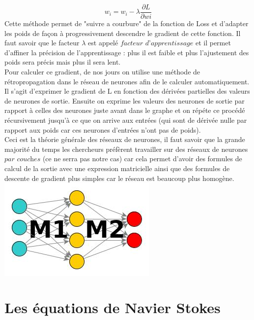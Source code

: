 \documentclass[12pt]{article}
\begin{document}
\[w_i = w_i-\lambda\frac{\partial L}{\partial wi}\]
Cette méthode permet de "suivre a courbure" de la fonction de Loss et d'adapter les poids de façon à progressivement descendre le gradient de cette fonction. Il faut savoir que le facteur $\lambda$ est appelé $\textit{facteur d'apprentissage}$ et il permet d'affiner la précision de l'apprentissage : plus il est faible et plus l'ajustement des poids sera précis mais plus il sera lent.\\
Pour calculer ce gradient, de nos jours on utilise une méthode de rétropropagation dans le réseau de neurones afin de le calculer automatiquement. Il s'agit d'exprimer le gradient de L en fonction des dérivées partielles des valeurs de neurones de sortie. Ensuite on exprime les valeurs des neurones de sortie par rapport à celles des neurones juste avant dans le graphe et on répéte ce procédé récursivement jusqu'à ce que on arrive aux entrées (qui sont de dérivée nulle par rapport aux poids car ces neurones d'entrées n'ont pas de poids).\\
Ceci est la théorie générale des réseaux de neurones, il faut savoir que la grande majorité du temps les chercheurs préfèrent travailler sur des réseaux de neurones $\textit{par couches}$ (ce ne serra pas notre cas) car cela permet d'avoir des formules de calcul de la sortie avec une expression matricielle ainsi que des formules de descente de gradient plus simples car le réseau est beaucoup plus homogène.\\
\indent\indent\indent\indent\indent\includegraphics[scale=0.7]{ex_layered_network.jpg}\\

\section{Les équations de Navier Stokes}
\end{document}
